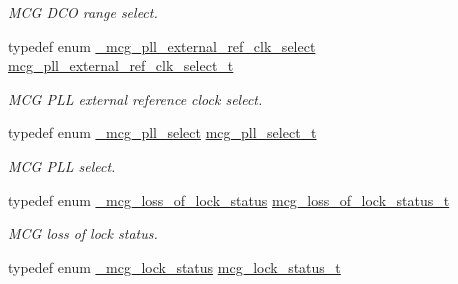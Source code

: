 \begin{DoxyCompactItemize}
\begin{DoxyCompactList}\small\item\em M\+CG D\+CO range select. \end{DoxyCompactList}\item 
typedef enum \hyperlink{group__mcg__hal_ga5e604e4ad82258e69fe4b9f52c6342d0}{\+\_\+mcg\+\_\+pll\+\_\+external\+\_\+ref\+\_\+clk\+\_\+select} \hyperlink{group__mcg__hal_ga08cdd9eefe4833e625fdf774f20e9d79}{mcg\+\_\+pll\+\_\+external\+\_\+ref\+\_\+clk\+\_\+select\+\_\+t}\hypertarget{group__mcg__hal_ga08cdd9eefe4833e625fdf774f20e9d79}{}\label{group__mcg__hal_ga08cdd9eefe4833e625fdf774f20e9d79}

\begin{DoxyCompactList}\small\item\em M\+CG P\+LL external reference clock select. \end{DoxyCompactList}\item 
typedef enum \hyperlink{group__mcg__hal_ga23a20e376b46abb54b99f388eca5fc3f}{\+\_\+mcg\+\_\+pll\+\_\+select} \hyperlink{group__mcg__hal_gafb40572909b677e4bedc5acb9e9b8b8f}{mcg\+\_\+pll\+\_\+select\+\_\+t}\hypertarget{group__mcg__hal_gafb40572909b677e4bedc5acb9e9b8b8f}{}\label{group__mcg__hal_gafb40572909b677e4bedc5acb9e9b8b8f}

\begin{DoxyCompactList}\small\item\em M\+CG P\+LL select. \end{DoxyCompactList}\item 
typedef enum \hyperlink{group__mcg__hal_ga0cadce5128e76d90b1f950b0e4af96b4}{\+\_\+mcg\+\_\+loss\+\_\+of\+\_\+lock\+\_\+status} \hyperlink{group__mcg__hal_ga1810893bd7bb7b089665c36595be0b39}{mcg\+\_\+loss\+\_\+of\+\_\+lock\+\_\+status\+\_\+t}\hypertarget{group__mcg__hal_ga1810893bd7bb7b089665c36595be0b39}{}\label{group__mcg__hal_ga1810893bd7bb7b089665c36595be0b39}

\begin{DoxyCompactList}\small\item\em M\+CG loss of lock status. \end{DoxyCompactList}\item 
typedef enum \hyperlink{group__mcg__hal_gaf76ca47748ece2d5f60d46a75ff67a7c}{\+\_\+mcg\+\_\+lock\+\_\+status} \hyperlink{group__mcg__hal_gafcc7b5430f2dab18ebb06641bc04225c}{mcg\+\_\+lock\+\_\+status\+\_\+t}\hypertarget{group__mcg__hal_gafcc7b5430f2dab18ebb06641bc04225c}{}\label{group__mcg__hal_gafcc7b5430f2dab18ebb06641bc04225c}


\end{DoxyCompactItemize}
